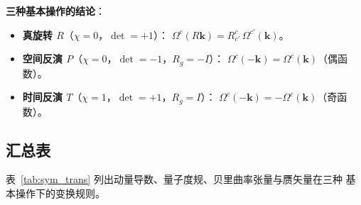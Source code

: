 \textbf{三种基本操作的结论}：
\begin{itemize}
  \item \textbf{真旋转 \(R\)}（\(\chi=0\)，\(\det=+1\)）：
        \(\Omega^c(R\mathbf{k}) = R^{c}_{c'}\,\Omega^{c'}(\mathbf{k})\)。
  \item \textbf{空间反演 \(P\)}（\(\chi=0\)，\(\det=-1\)，\(R_g=-I\)）：
        \(\Omega^c(-\mathbf{k}) = \Omega^c(\mathbf{k})\)（偶函数）。
  \item \textbf{时间反演 \(T\)}（\(\chi=1\)，\(\det=+1\)，\(R_g=I\)）：
        \(\Omega^c(-\mathbf{k}) = -\Omega^c(\mathbf{k})\)（奇函数）。
\end{itemize}

\subsection{汇总表}

表~\ref{tab:sym_trans} 列出动量导数、量子度规、贝里曲率张量与赝矢量在三种
基本操作下的变换规则。

